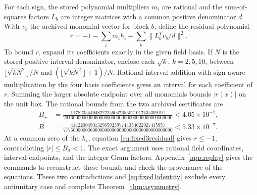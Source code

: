 For each sign, the stored polynomial multipliers $m_i$ are rational and the sum-of-squares factors $L_b$ are integer matrices with a common positive denominator $d$. With $v_b$ the archived monomial vector for block $b$, define the residual polynomial
\begin{equation}\label{eq:fixed3residual}
 r=-1-\sum_i m_i h_i -\sum_b \|L_b^T v_b/d\|^2.
\end{equation}
To bound $r$, expand its coefficients exactly in the given field basis. If $N$ is the stored positive interval denominator, enclose each $\sqrt{k}$, $k=2,5,10$, between $\lfloor\sqrt{kN^2}\rfloor/N$ and $(\lfloor\sqrt{kN^2}\rfloor+1)/N$. Rational interval addition with sign-aware multiplication by the four basis coefficients gives an interval for each coefficient of $r$. Summing the larger absolute endpoint over all monomials bounds $|r(x)|$ on the unit box. The rational bounds from the two archived certificates are
\begin{align*}
 B_{+}&=\frac{117823544948222256047655021017435399191}
 {291600000000000000000000000000000000000000000}
 <4.05\times10^{-7},\\
 B_{-}&=\frac{414220049013296592397744354622927415857}
 {777600000000000000000000000000000000000000000}
 <5.33\times10^{-7}.
\end{align*}
At a common zero of the $h_i$, equation \eqref{eq:fixed3residual} gives $r\le-1$, contradicting $|r|\le B_\sigma<1$. The exact argument uses rational field coordinates, interval endpoints, and the integer Gram factors. Appendix~\ref{app:replay} gives the commands to reconstruct these bounds and check the provenance of the equations. These two contradictions and \eqref{eq:fixed1identity} exclude every antiunitary case and complete Theorem~\ref{thm:asymmetry}.
